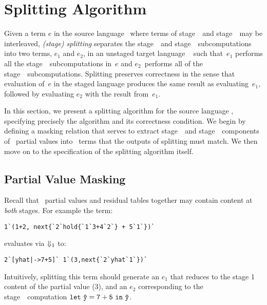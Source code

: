 \section{Splitting Algorithm}
\label{sec:splitting}

Given a term $e$ in the source language \lang\ where terms of
stage~\bbone\ and stage~\bbtwo\ may be interleaved, \emph{(stage)
  splitting} separates the stage~\bbone\ and stage~\bbtwo\
subcomputations into two terms, $e_1$ and $e_2$, in an unstaged target language \langmono\ 
such that~$e_1$ performs all the
stage~\bbone\ subcomputations in~$e$ and $e_2$~performs all of the
stage~\bbtwo\ subcomputations. Splitting preserves correctness in the sense that evaluation of~$e$ in
the staged language produces the same result as evaluating~$e_1$, followed by evaluating 
$e_2$ with the result from~$e_1$.

In this section, we present a
splitting algorithm for the source language \lang, specifying
precisely the algorithm and its correctness condition.  
We begin by defining a masking relation that serves to extract stage~\bbone\ and
stage~\bbtwo\ components of \lang\ partial values into \langmono\ terms that the outputs of splitting must match. We then 
move on to the specification of the splitting algorithm itself.


\subsection{Partial Value Masking}


Recall that \lang\ partial values and residual tables together may
contain content at \emph{both} stages. For example the term:
\begin{lstlisting}
1`(1+2, next{`2`hold{`1`3+4`2`} + 5`1`})`
\end{lstlisting}
evaluates via ${\Downarrow_{ 1}}$ to:
\begin{lstlisting}
2`[yhat|->7+5]` 1`(3,next{`2`yhat`1`})`
\end{lstlisting}
Intuitively, splitting this term should generate an $e_1$ that reduces to the stage 1 content of the partial value (3), and an $e_2$ corresponding to the stage~\bbtwo\
computation ${\tt let}~{\mathtt{\hat y}} = {\mathtt{7+5}}~{\tt in}~{\mathtt{\hat y}}$.

